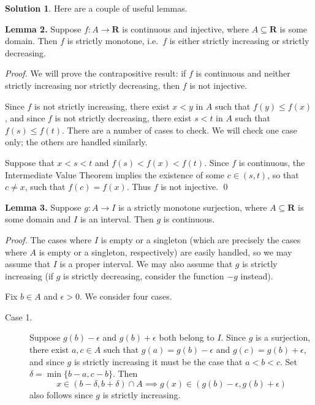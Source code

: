 \documentclass[12pt]{article}
\theoremstyle{definition}
\theoremstyle{exercise}
\theoremstyle{solution}
\newtheorem*{solution}{Solution}
\newcommand{\R}{\mathbf{R}}
\begin{document}
\begin{solution}
    Here are a couple of useful lemmas.

    \vspace{2mm}

    \noindent \textbf{Lemma 2.} Suppose \( f : A \to \R \) is continuous and injective, where \( A \subseteq \R \) is some domain. Then \( f \) is strictly monotone, i.e.\ \( f \) is either strictly increasing or strictly decreasing.

    \vspace{2mm}

    \noindent \textit{Proof.} We will prove the contrapositive result: if \( f \) is continuous and neither strictly increasing nor strictly decreasing, then \( f \) is not injective.

    Since \( f \) is not strictly increasing, there exist \( x < y \) in \( A \) such that \( f(y) \leq f(x) \), and since \( f \) is not strictly decreasing, there exist \( s < t \) in \( A \) such that \( f(s) \leq f(t) \). There are a number of cases to check. We will check one case only; the others are handled similarly.

    Suppose that \( x < s < t \) and \( f(s) < f(x) < f(t) \). Since \( f \) is continuous, the Intermediate Value Theorem implies the existence of some \( c \in (s, t) \), so that \( c \neq x \), such that \( f(c) = f(x) \). Thus \( f \) is not injective. \qed

    \vspace{2mm}

    \noindent \textbf{Lemma 3.} Suppose \( g : A \to I \) is a strictly monotone surjection, where \( A \subseteq \R \) is some domain and \( I \) is an interval. Then \( g \) is continuous.

    \vspace{2mm}

    \noindent \textit{Proof.} The cases where \( I \) is empty or a singleton (which are precisely the cases where \( A \) is empty or a singleton, respectively) are easily handled, so we may assume that \( I \) is a proper interval. We may also assume that \( g \) is strictly increasing (if \( g \) is strictly decreasing, consider the function \( -g \) instead).

    Fix \( b \in A \) and \( \epsilon > 0 \). We consider four cases.
    \begin{description}
        \item[Case 1.] Suppose \( g(b) - \epsilon \) and \( g(b) + \epsilon \) both belong to \( I \). Since \( g \) is a surjection, there exist \( a, c \in A \) such that \( g(a) = g(b) - \epsilon \) and \( g(c) = g(b) + \epsilon \), and since \( g \) is strictly increasing it must be the case that \( a < b < c \). Set \( \delta = \min \{ b - a, c - b \} \). Then
        \[
            x \in (b - \delta, b + \delta) \cap A \implies g(x) \in (g(b) - \epsilon, g(b) + \epsilon)
        \]
        also follows since \( g \) is strictly increasing.


\end{description}
\end{solution}
\end{document}
